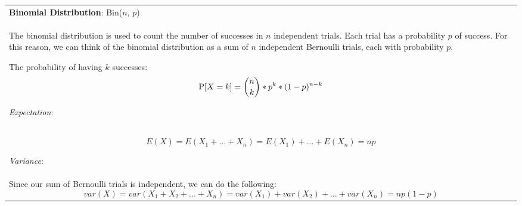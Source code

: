 {\tabulinesep=1mm
\begin{tabu}{|p{16cm} |}
\hline
\textbf{Binomial Distribution}: Bin($n$, $p$) \\

The binomial distribution is used to count the number of successes in $n$ independent trials. Each trial has a probability $p$ of success. For this reason, we can think of the binomial distribution as a sum of $n$ independent Bernoulli trials, each with probability $p$. 

The probability of having $k$ successes:
$$\P[X = k] = {n \choose k} * p^k * (1 - p)^{n - k}$$

\textit{Expectation}: \\
$$E(X) = E(X_1 + \dotsc + X_n) = E(X_1) + \dotsc + E(X_n) = np$$

\textit{Variance}: \\
Since our sum of Bernoulli trials is independent, we can do the following:
$$var(X) = var(X_1 + X_2 + ... + X_n) = var(X_1) + var(X_2) + ... + var(X_n) = np(1-p)$$
\\
\hline
\end{tabu}
}